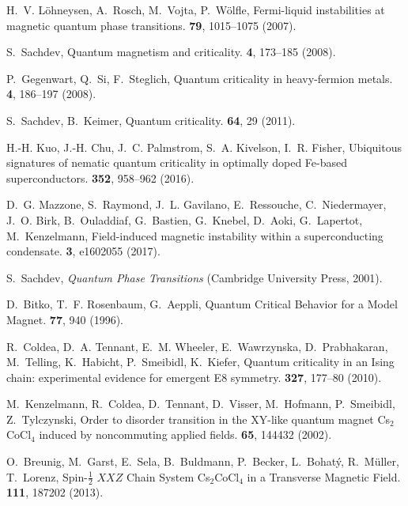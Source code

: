 \documentclass[12pt]{article}
\begin{document}
\begin{thebibliography}{10}

H.~V. L{\"{o}}hneysen, A.~Rosch, M.~Vojta, P.~W{\"{o}}lfle, {Fermi-liquid
  instabilities at magnetic quantum phase transitions}.
 {\bf 79}, 1015--1075 (2007).

S.~Sachdev, {Quantum magnetism and criticality}.
 {\bf 4}, 173--185 (2008).

P.~Gegenwart, Q.~Si, F.~Steglich, {Quantum criticality in heavy-fermion
  metals}.
 {\bf 4}, 186--197 (2008).

S.~Sachdev, B.~Keimer, {Quantum criticality}.
 {\bf 64}, 29 (2011).

H.-H. Kuo, J.-H. Chu, J.~C. Palmstrom, S.~A. Kivelson, I.~R. Fisher,
  {Ubiquitous signatures of nematic quantum criticality in optimally doped
  Fe-based superconductors}.
 {\bf 352}, 958--962 (2016).

D.~G. Mazzone, S.~Raymond, J.~L. Gavilano, E.~Ressouche, C.~Niedermayer, J.~O.
  Birk, B.~Ouladdiaf, G.~Bastien, G.~Knebel, D.~Aoki, G.~Lapertot,
  M.~Kenzelmann, {Field-induced magnetic instability within a superconducting
  condensate}.
 {\bf 3}, e1602055 (2017).

S.~Sachdev, {\it {Quantum Phase Transitions}\/} (Cambridge University Press,
  2001).

D.~Bitko, T.~F. Rosenbaum, G.~Aeppli, {Quantum Critical Behavior for a Model
  Magnet.}
 {\bf 77}, 940 (1996).

R.~Coldea, D.~A. Tennant, E.~M. Wheeler, E.~Wawrzynska, D.~Prabhakaran,
  M.~Telling, K.~Habicht, P.~Smeibidl, K.~Kiefer, {Quantum criticality in an
  Ising chain: experimental evidence for emergent E8 symmetry.}
 {\bf 327}, 177--80 (2010).

M.~Kenzelmann, R.~Coldea, D.~Tennant, D.~Visser, M.~Hofmann, P.~Smeibidl,
  Z.~Tylczynski, {Order to disorder transition in the XY-like quantum magnet
  Cs$_2$CoCl$_4$ induced by noncommuting applied fields}.
 {\bf 65}, 144432 (2002).

O.~Breunig, M.~Garst, E.~Sela, B.~Buldmann, P.~Becker, L.~Bohat{\'{y}},
  R.~M{\"{u}}ller, T.~Lorenz, {Spin-$\frac{1}{2}$ $XXZ$ Chain System
  Cs$_2$CoCl$_4$ in a Transverse Magnetic Field}.
 {\bf 111}, 187202 (2013).


\end{thebibliography}
\end{document}
